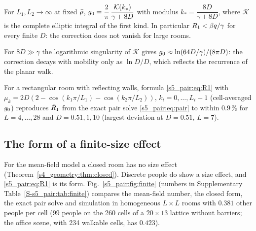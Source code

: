 \begin{corollary}\label{s5_pair:cor:infinite}
  For $L_1,L_2\to\infty$ at fixed $\bar{\rho}$,
  $g_0=\dfrac{2}{\pi}\,\dfrac{\mathcal{K}(k_*)}{\gamma+8D}$ with modulus $k_*=\dfrac{8D}{\gamma+8D}$, where
  $\mathcal{K}$ is the complete elliptic integral of the first kind.  In particular $R_1<\beta q/\gamma$ for
  every finite $D$: the correction does not vanish for large rooms.
\end{corollary}

For $8D\gg\gamma$ the logarithmic singularity of $\mathcal{K}$ gives $g_0\approx\ln(64D/\gamma)/(8\pi D)$: the
correction decays with mobility only as $\ln D/D$, which reflects the recurrence of the planar walk.

\begin{observation}\label{s5_pair:obs:reflecting}
  For a rectangular room with reflecting walls, formula \eqref{s5_pair:eq:R1} with
  $\mu_k=2D(2-\cos(k_1\pi/L_1)-\cos(k_2\pi/L_2))$, $k_i=0,\dots,L_i-1$ (cell-averaged $g_0$) reproduces
  $\bar{R}_1$ from the exact pair solve \eqref{s5_pair:eq:pair} to within $0.9\,\%$ for $L=4,\dots,28$ and
  $D=0.51,1,10$ (largest deviation at $D=0.51$, $L=7$).
\end{observation}

\subsection{The form of a finite-size effect}\label{s5_pair:sec:finite}

For the mean-field model a closed room has no size effect (Theorem~\ref{s4_geometry:thm:closed}). Discrete
people do show a size effect, and \eqref{s5_pair:eq:R1} is its form. Fig.~\ref{s5_pair:fig:finite} (numbers in
Supplementary Table~\ref{S-s5_pair:tab:finite}) compares the mean-field number, the closed form, the exact pair
solve and simulation in homogeneous $L\times L$ rooms with $0.381$ other people per cell (99 people on the 260
cells of a $20\times13$ lattice without barriers; the office scene, with 234 walkable cells, has $0.423$).

